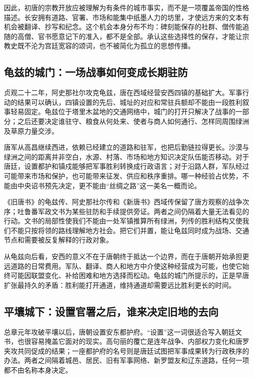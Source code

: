 因此，初唐的宗教开放应被理解为有条件的城市事实，而不是一项覆盖帝国的性格描述。长安拥有道路、官署、市场和能集中纸墨人力的坊里，才使远方来的文本有机会被翻译、抄写和纪念。这个机会本身分布不均：碑刻能保存的社群、僧传能追随的高僧、官书愿意记下的准入，都不是全部。承认这些选择性的保存，才能让宗教史既不沦为宫廷宽容的颂词，也不被简化为孤立的思想传播。

\subsection{龟兹的城门：一场战事如何变成长期驻防}
贞观二十二年，阿史那社尔攻克龟兹，唐在西域经营安西四镇的基础扩大。军事行动的结果可以确认，四镇设置的先后、城址的对应和常驻兵额却不能由一段胜利叙事轻易固定。龟兹位于塔里木盆地的交通网络中，城门的打开只解决了战事的一部分；之后还要决定谁驻守、粮食从何处来、使者与商人如何通行、怎样同周围绿洲及草原力量交涉。

唐军从高昌继续西进，依赖已经建立的道路和驻军，也把后勤链拉得更长。沙漠与绿洲之间的距离并非空白，水源、村落、市场和地方知识决定队伍能否移动。对于唐廷，设置都护和镇戍能够把军事胜利转换成行政语言；对于沿路人群，军队经过可能带来市场和保护，也可能带来征发、供应和秩序重排。哪一种经验占优势，不能由中央诏书预先决定，更不能由“丝绸之路”这一美名一概而论。

《旧唐书》的龟兹传、阿史那社尔传和《新唐书》西域传保留了唐方观察的战争次序；吐鲁番军政文书为某些驻防和手续提供旁证。两者之间仍隔着大量无法看见的行动。文书的局部性使我们不能由一处军镇推算所有绿洲，列传的胜利结构又使我们不能只按将领的路线理解地方社会。把它们并置，能让龟兹同时成为战场、交通节点和需要被反复解释的行政对象。

从龟兹向后看，安西的意义不在于唐朝终于抵达一个边界，而在于唐朝开始承担更远道路的日常费用。军队、翻译、商人和地方中介使这种经营成为可能，也使它始终可能因联盟变化、补给困难和地方选择而松动。龟兹的城门所提示的，正是早唐扩张最持久的矛盾：胜利能打开通道，维持通道却需要远比胜利更长的时间。

\subsection{平壤城下：设置官署之后，谁来决定旧地的去向}
总章元年攻破平壤以后，唐朝设置安东都护府。“设置”这一词很适合写入朝廷文书，也很容易掩盖它面对的现实。高句丽的覆亡是连年战争、内部权力变化和唐罗夹攻共同促成的结果；一座都护府的名号则是唐廷试图把军事成果转为行政秩序的办法。两者之间隔着城邑、居民、旧有军事网络、新罗盟友和辽东道路，任何一项都不由名称本身决定。

